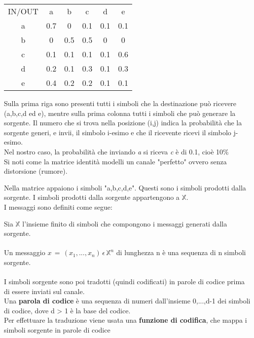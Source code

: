 \documentclass{article}
\begin{document}
    \begin{center}
        \begin{tabular}{ c c c c c c }
            IN/OUT &  a & b & c & d & e  \\
            a & 0.7 & 0 & 0.1 & 0.1 & 0.1  \\
            b & 0 & 0.5 & 0.5 & 0 & 0 \\
            c & 0.1 & 0.1 & 0.1 & 0.1 & 0.6 \\
            d & 0.2 & 0.1 & 0.3 & 0.1 & 0.3   \\
            e & 0.4 & 0.2 & 0.2 & 0.1 & 0.1 \\
        \end{tabular}
    \end{center}

    Sulla prima riga sono presenti tutti i simboli che la destinazione può ricevere (a,b,c,d ed e), mentre sulla prima colonna tutti i simboli che può generare la sorgente. Il numero che si trova nella posizione (i,j) indica la probabilità che  la sorgente generi, e invii, il simbolo i-esimo e che il ricevente ricevi il simbolo j-esimo. \\
    Nel nostro caso,  la probabilità che inviando \textit{a} si riceva \textit{c} è di 0.1, cioè 10\% \\
    Si noti come la matrice identità modelli un canale "perfetto" ovvero senza distorsione (rumore).
    \vspace{10px}

    \noindent Nella matrice appaiono i simboli "a,b,c,d,e". Questi sono i simboli prodotti dalla sorgente. I simboli prodotti dalla sorgente appartengono a $\mathbb{X}$.
    \\
    I messaggi sono definiti come segue:
    \vspace{5px}

    \noindent Sia $\mathbb{X}$ l'insieme finito di simboli che compongono i messaggi generati dalla sorgente. \\ \\
    Un messaggio $x \, = \,(x_1,...,x_n)\, \epsilon \, \mathbb{X}^n$ di lunghezza n è una sequenza di n simboli sorgente.
    \\ \\
    I simboli sorgente sono poi tradotti (quindi codificati) in parole di codice prima di essere inviati sul canale. \\
    Una \textbf{parola di codice} è una sequenza di numeri dall'insieme {0,...,d-1} dei simboli di codice, dove d > 1 è la base del codice.\\
    Per effettuare la traduzione viene usata una \textbf{funzione di codifica}, che mappa i simboli sorgente in parole di codice
\end{document}
